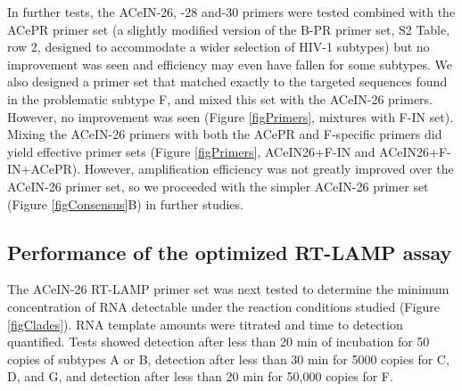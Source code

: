 \documentclass[../sherrill-Mix_thesis.tex]{subfiles}
\begin{document}
			In further tests, the ACeIN-26, -28 and-30 primers were tested combined with the ACePR primer set (a slightly modified version of the B-PR primer set, S2 Table, row 2, designed to accommodate a wider selection of HIV-1 subtypes) but no improvement was seen and efficiency may even have fallen for some subtypes. We also designed a primer set that matched exactly to the targeted sequences found in the problematic subtype F, and mixed this set with the ACeIN-26 primers. However, no improvement was seen (Figure \ref{figPrimers}, mixtures with F-IN set). Mixing the ACeIN-26 primers with both the ACePR and F-specific primers did yield effective primer sets (Figure \ref{figPrimers}, ACeIN26+F-IN and ACeIN26+F-IN+ACePR). However, amplification efficiency was not greatly improved over the ACeIN-26 primer set, so we proceeded with the simpler ACeIN-26 primer set (Figure \ref{figConsensus}B) in further studies.

			\subsection{Performance of the optimized RT-LAMP assay}
			The ACeIN-26 RT-LAMP primer set was next tested to determine the minimum concentration of RNA detectable under the reaction conditions studied (Figure \ref{figClades}). RNA template amounts were titrated and time to detection quantified. Tests showed detection after less than 20 min of incubation for 50 copies of subtypes A or B, detection after less than 30 min for 5000 copies for C, D, and G, and detection after less than 20 min for 50,000 copies for F.
\end{document}
